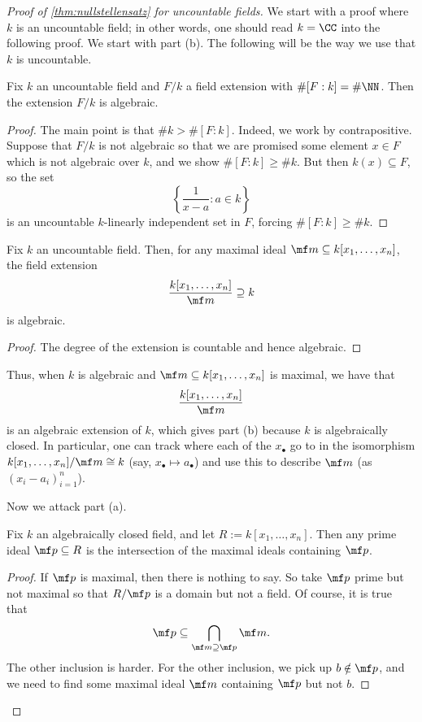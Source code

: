 \begin{proof}[Proof of \autoref{thm:nullstellensatz} for uncountable fields]
	We start with a proof where $k$ is an uncountable field; in other words, one should read $k=\CC$ into the following proof. We start with part (b). The following will be the way we use that $k$ is uncountable.
	\begin{lemma}
		Fix $k$ an uncountable field and $F/k$ a field extension with $\#[F:k]=\#\NN$. Then the extension $F/k$ is algebraic.
	\end{lemma}
	\begin{proof}
		The main point is that $\#k>\#[F:k]$. Indeed, we work by contrapositive. Suppose that $F/k$ is not algebraic so that we are promised some element $x\in F$ which is not algebraic over $k$, and we show $\#[F:k]\ge\#k$. But then $k(x)\subseteq F$, so the set
		\[\left\{\frac1{x-a}:a\in k\right\}\]
		is an uncountable $k$-linearly independent set in $F$, forcing $\#[F:k]\ge\#k$.
	\end{proof}
	\begin{corollary}
		Fix $k$ an uncountable field. Then, for any maximal ideal $\mf m\subseteq k[x_1,\ldots,x_n]$, the field extension
		\[\frac{k[x_1,\ldots,x_n]}{\mf m}\supseteq k\]
		is algebraic.
	\end{corollary}
	\begin{proof}
		The degree of the extension is countable and hence algebraic.
	\end{proof}
	Thus, when $k$ is algebraic and $\mf m\subseteq k[x_1,\ldots,x_n]$ is maximal, we have that
	\[\frac{k[x_1,\ldots,x_n]}{\mf m}\]
	is an algebraic extension of $k$, which gives part (b) because $k$ is algebraically closed. In particular, one can track where each of the $x_\bullet$ go to in the isomorphism $k[x_1,\ldots,x_n]/\mf m\cong k$ (say, $x_\bullet\mapsto a_\bullet$) and use this to describe $\mf m$ (as $(x_i-a_i)_{i=1}^n$).

	Now we attack part (a).
	\begin{lemma} \label{lem:betterjacobson}
		Fix $k$ an algebraically closed field, and let $R:=k[x_1,\ldots,x_n]$. Then any prime ideal $\mf p\subseteq R$ is the intersection of the maximal ideals containing $\mf p$.
	\end{lemma}
	\begin{proof}
		If $\mf p$ is maximal, then there is nothing to say. So take $\mf p$ prime but not maximal so that $R/\mf p$ is a domain but not a field. Of course, it is true that
		\[\mf p\subseteq\bigcap_{\mf m\supseteq\mf p}\mf m.\]
		The other inclusion is harder. For the other inclusion, we pick up $b\notin\mf p$, and we need to find some maximal ideal $\mf m$ containing $\mf p$ but not $b$.


\end{proof}
\end{proof}
